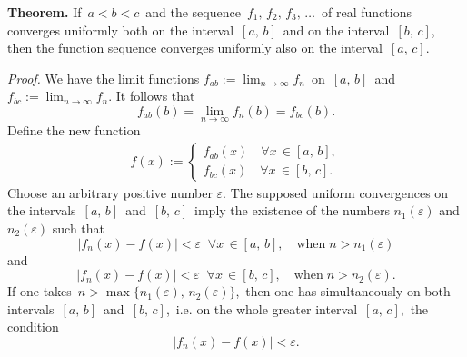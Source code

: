 \documentclass[12pt]{article}
\theoremstyle{definition}
\begin{document}
\textbf{Theorem.}  If\, $a < b < c$\, and the sequence \,$f_1,\,f_2,\,f_3,\,\ldots$\, of real functions converges uniformly both on the interval \,$[a,\,b]$\, and on the interval\, $[b,\,c]$,\, then the function sequence converges uniformly also on the  interval\, $[a,\,c]$.

{\em Proof.}  We have the limit functions $\displaystyle f_{ab} := \lim_{n\to\infty}f_n$\, on\, $[a,\,b]$\, and\, 
$\displaystyle f_{bc} := \lim_{n\to\infty}f_n$.  It follows that
$$f_{ab}(b) = \lim_{n\to\infty}f_n(b) = f_{bc}(b).$$
Define the new function
\begin{align*}
f(x) :=
\begin{cases}
f_{ab}(x) \quad \forall x\,\in [a,\,b],\\
f_{bc}(x) \quad \forall x\,\in [b,\,c].
\end{cases}
\end{align*}
Choose an arbitrary positive number $\varepsilon$.  The supposed uniform convergences on the intervals\, $[a,\,b]$\, and\, $[b,\,c]$\, imply the existence of the numbers $n_1(\varepsilon)$ and $n_2(\varepsilon)$ such that
$$|f_n(x)-f(x)| < \varepsilon\;\;\forall x\,\in [a,\,b],\quad\mbox{when}\; n > n_1(\varepsilon)$$
and 
$$|f_n(x)-f(x)| < \varepsilon\;\;\forall x\,\in [b,\,c],\quad\mbox{when}\; n > n_2(\varepsilon).$$
If one takes\, $n > \max\{n_1(\varepsilon),\,n_2(\varepsilon)\}$,\, then one has simultaneously on both intervals\, $[a,\,b]$\, and\, $[b,\,c]$,\, i.e. on the whole greater interval\, $[a,\,c]$,\, the condition
$$|f_n(x)-f(x)| < \varepsilon.$$




\end{document}

